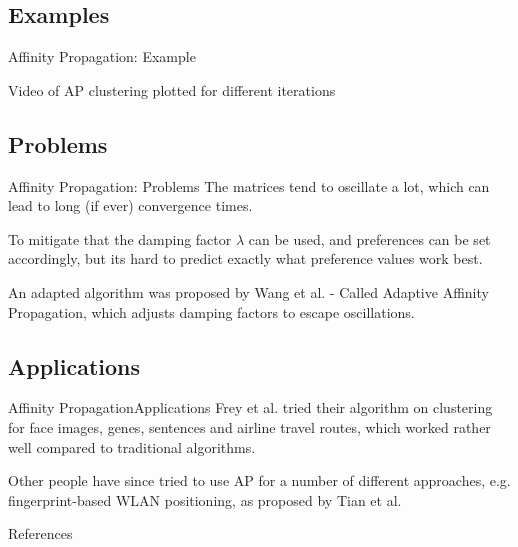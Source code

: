 \documentclass{beamer}
\begin{document}
\subsection{Examples}
\begin{frame}{Affinity Propagation: Example}
	\begin{center}
		Video of AP clustering plotted for different iterations
	\end{center}
\end{frame}

\subsection{Problems}
\begin{frame}{Affinity Propagation: Problems}
	The matrices tend to oscillate a lot, which can lead to long (if ever) convergence times. \cite{frey2007clustering} 
	
	To mitigate that the damping factor $\lambda$ can be used, and preferences can be set accordingly, but its hard to predict exactly what preference values work best. \cite{wang2008adaptive}
	
	An adapted algorithm was proposed by Wang et al. - Called Adaptive Affinity Propagation, which adjusts damping factors to escape oscillations. \cite{wang2008adaptive}
\end{frame}

\subsection{Applications}
\begin{frame}{Affinity Propagation}{Applications}
	Frey et al. tried their algorithm on clustering for face images, genes, sentences and airline travel routes, which worked rather well compared to traditional algorithms. \cite{frey2007clustering}
	
	Other people have since tried to use AP for a number of different approaches, e.g. fingerprint-based WLAN positioning, as proposed by Tian et al. \cite{tian2013fingerprint}
\end{frame}

\begin{frame}{References}
	
\end{frame}
\end{document}
